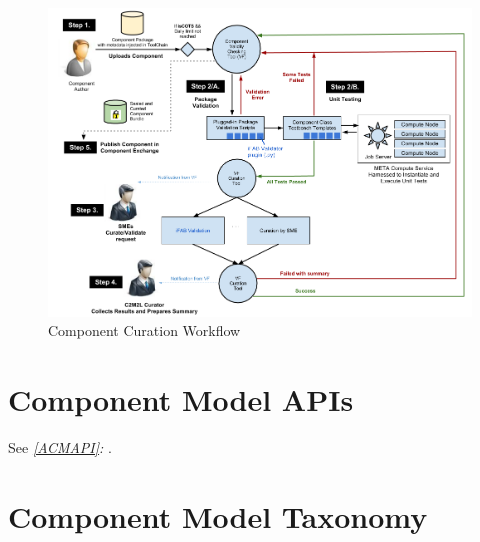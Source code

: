 \begin{figure}
\includegraphics[width=\textwidth]{Curation_Workflow}
\caption{Component Curation Workflow}
\label{Curation_Workflow}
\end{figure}

\section{Component Model APIs}
See \textit{\autoref{ACMAPI}: }.

\section{Component Model Taxonomy}

